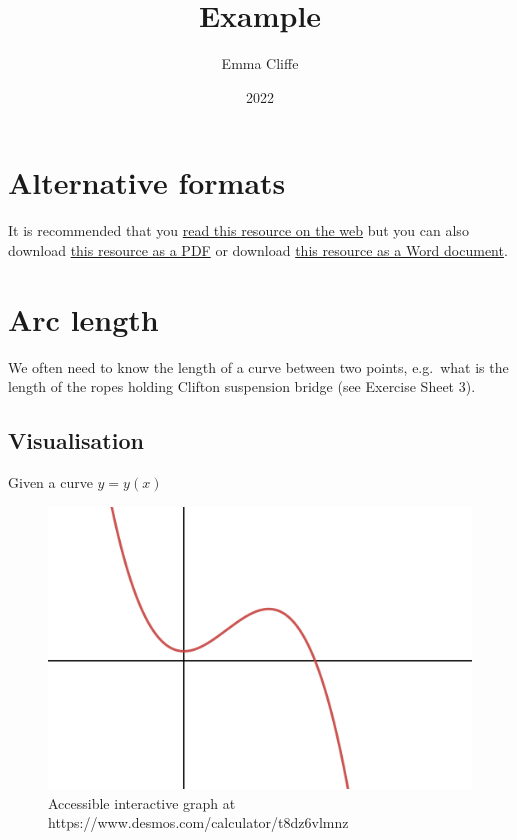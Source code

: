 \documentclass[
  12pt,
  a4paper]{article}
\title{Example}
\author{Emma Cliffe}
\date{2022}
\begin{document}
\maketitle

{
\hypersetup{linkcolor=}
\setcounter{tocdepth}{2}
\tableofcontents
}
\hypertarget{alternative-formats}{%
\section{Alternative formats}\label{alternative-formats}}

It is recommended that you \href{./arclengthInR.html}{read this resource
on the web} but you can also download \href{./arclengthInR.pdf}{this
resource as a PDF} or download \href{./arclengthInR.docx}{this resource
as a Word document}.

\hypertarget{arc-length}{%
\section{Arc length}\label{arc-length}}

We often need to know the length of a curve between two points,
e.g.~what is the length of the ropes holding Clifton suspension bridge
(see Exercise Sheet 3).

\hypertarget{visualisation}{%
\subsection{Visualisation}\label{visualisation}}

Given a curve \(y=y(x)\)

\begin{figure}
\includegraphics[height=0.2\textheight]{arclength1} \caption{Accessible interactive graph at https://www.desmos.com/calculator/t8dz6vlmnz}\label{fig:unnamed-chunk-1}
\end{figure}
\end{document}
